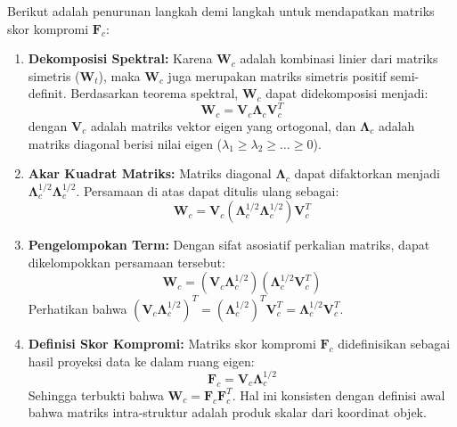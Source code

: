 \documentclass[a4paper]{article}
\theoremstyle{definition} %
\begin{document}
Berikut adalah penurunan langkah demi langkah untuk mendapatkan matriks skor kompromi $\mathbf{F}_c$:

\begin{enumerate}
    \item \textbf{Dekomposisi Spektral:} Karena $\mathbf{W}_c$ adalah kombinasi linier dari matriks simetris ($\mathbf{W}_t$), maka $\mathbf{W}_c$ juga merupakan matriks simetris positif semi-definit. Berdasarkan teorema spektral, $\mathbf{W}_c$ dapat didekomposisi menjadi:
    \begin{equation}
        \mathbf{W}_c = \mathbf{V}_c \mathbf{\Lambda}_c \mathbf{V}_c^T
    \end{equation}
    dengan $\mathbf{V}_c$ adalah matriks vektor eigen yang ortogonal, dan $\mathbf{\Lambda}_c$ adalah matriks diagonal berisi nilai eigen ($\lambda_1 \ge \lambda_2 \ge \dots \ge 0$).
    
    \item \textbf{Akar Kuadrat Matriks:} Matriks diagonal $\mathbf{\Lambda}_c$ dapat difaktorkan menjadi $\mathbf{\Lambda}_c^{1/2} \mathbf{\Lambda}_c^{1/2}$. Persamaan di atas dapat ditulis ulang sebagai:
    \begin{equation}
        \mathbf{W}_c = \mathbf{V}_c (\mathbf{\Lambda}_c^{1/2} \mathbf{\Lambda}_c^{1/2}) \mathbf{V}_c^T
    \end{equation}
    
    \item \textbf{Pengelompokan Term:} Dengan sifat asosiatif perkalian matriks, dapat dikelompokkan persamaan tersebut:
    \begin{equation}
        \mathbf{W}_c = (\mathbf{V}_c \mathbf{\Lambda}_c^{1/2}) (\mathbf{\Lambda}_c^{1/2} \mathbf{V}_c^T)
    \end{equation}
    Perhatikan bahwa $(\mathbf{V}_c \mathbf{\Lambda}_c^{1/2})^T = (\mathbf{\Lambda}_c^{1/2})^T \mathbf{V}_c^T = \mathbf{\Lambda}_c^{1/2} \mathbf{V}_c^T$.
    
    \item \textbf{Definisi Skor Kompromi:} Matriks skor kompromi $\mathbf{F}_c$ didefinisikan sebagai hasil proyeksi data ke dalam ruang eigen:
    \begin{equation}
        \mathbf{F}_c = \mathbf{V}_c \mathbf{\Lambda}_c^{1/2}
    \end{equation}
    Sehingga terbukti bahwa $\mathbf{W}_c = \mathbf{F}_c \mathbf{F}_c^T$. Hal ini konsisten dengan definisi awal bahwa matriks intra-struktur adalah produk skalar dari koordinat objek.
\end{enumerate}
\end{document}
